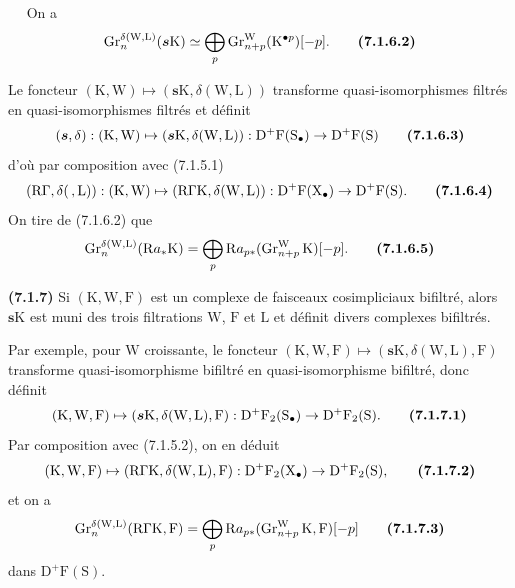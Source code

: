 \documentclass[11pt,leqno]{article}
\newcommand{\Page}[1]{\ifvmode\noindent\else\unskip\ \fi{\footnotesize\textcolor{gray}{[p.\,#1]}}\ \ignorespaces}
\begin{document}
\Page{25}
On a
\[
\operatorname{Gr}_{n}^{\delta(\mathrm{W},\mathrm{L})}
(\boldsymbol{s}\mathrm{K})
\simeq
\bigoplus_p\operatorname{Gr}_{n+p}^{\mathrm{W}}
(\mathrm{K}^{\bullet p})[-p].
\tag*{\textbf{(7.1.6.2)}}
\]

Le foncteur \((\mathrm{K},\mathrm{W})\mapsto
(\boldsymbol{s}\mathrm{K},\delta(\mathrm{W},\mathrm{L}))\) transforme quasi-isomorphismes filtrés en quasi-isomorphismes filtrés et définit
\[
(\boldsymbol{s},\delta):
(\mathrm{K},\mathrm{W})\mapsto
(\boldsymbol{s}\mathrm{K},\delta(\mathrm{W},\mathrm{L})):
\mathrm{D}^{+}\mathrm{F}(\mathrm{S}_{\bullet})
\to\mathrm{D}^{+}\mathrm{F}(\mathrm{S})
\tag*{\textbf{(7.1.6.3)}}
\]
d’où par composition avec (7.1.5.1)
\[
(\mathrm{R}\Gamma,\delta(\, ,\mathrm{L})):
(\mathrm{K},\mathrm{W})\mapsto
(\mathrm{R}\Gamma\mathrm{K},\delta(\mathrm{W},\mathrm{L})):
\mathrm{D}^{+}\mathrm{F}(\mathrm{X}_{\bullet})
\to\mathrm{D}^{+}\mathrm{F}(\mathrm{S}).
\tag*{\textbf{(7.1.6.4)}}
\]
On tire de (7.1.6.2) que
\[
\operatorname{Gr}_{n}^{\delta(\mathrm{W},\mathrm{L})}
(\mathrm{R}a_{\ast}\mathrm{K})
=\bigoplus_p\mathrm{R}a_{p\ast}
(\operatorname{Gr}_{n+p}^{\mathrm{W}}\mathrm{K})[-p].
\tag*{\textbf{(7.1.6.5)}}
\]

\textbf{(7.1.7)} Si \((\mathrm{K},\mathrm{W},\mathrm{F})\) est un complexe de faisceaux cosimpliciaux bifiltré, alors \(\boldsymbol{s}\mathrm{K}\) est muni des trois filtrations \(\mathrm{W}\), \(\mathrm{F}\) et \(\mathrm{L}\) et définit divers complexes bifiltrés.

Par exemple, pour \(\mathrm{W}\) croissante, le foncteur \((\mathrm{K},\mathrm{W},\mathrm{F})\mapsto
(\boldsymbol{s}\mathrm{K},\delta(\mathrm{W},\mathrm{L}),\mathrm{F})\) transforme quasi-isomorphisme bifiltré en quasi-isomorphisme bifiltré, donc définit
\[
(\mathrm{K},\mathrm{W},\mathrm{F})\mapsto
(\boldsymbol{s}\mathrm{K},\delta(\mathrm{W},\mathrm{L}),\mathrm{F}):
\mathrm{D}^{+}\mathrm{F}_2(\mathrm{S}_{\bullet})
\to\mathrm{D}^{+}\mathrm{F}_2(\mathrm{S}).
\tag*{\textbf{(7.1.7.1)}}
\]
Par composition avec (7.1.5.2), on en déduit
\[
(\mathrm{K},\mathrm{W},\mathrm{F})\mapsto
(\mathrm{R}\Gamma\mathrm{K},\delta(\mathrm{W},\mathrm{L}),\mathrm{F}):
\mathrm{D}^{+}\mathrm{F}_2(\mathrm{X}_{\bullet})
\to\mathrm{D}^{+}\mathrm{F}_2(\mathrm{S}),
\tag*{\textbf{(7.1.7.2)}}
\]
et on a
\[
\operatorname{Gr}_{n}^{\delta(\mathrm{W},\mathrm{L})}
(\mathrm{R}\Gamma\mathrm{K},\mathrm{F})
=\bigoplus_p\mathrm{R}a_{p\ast}
(\operatorname{Gr}_{n+p}^{\mathrm{W}}\mathrm{K},\mathrm{F})[-p]
\tag*{\textbf{(7.1.7.3)}}
\]
dans \(\mathrm{D}^{+}\mathrm{F}(\mathrm{S})\).
\end{document}
